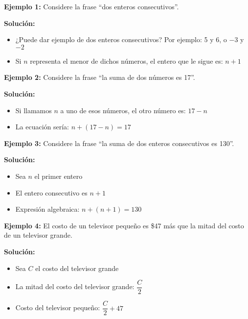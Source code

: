 \begin{example}
\textbf{Ejemplo 1:} Considere la frase ``dos enteros consecutivos''.

\textbf{Solución:}
\begin{itemize}
    \item ¿Puede dar ejemplo de dos enteros consecutivos? Por ejemplo: 5 y 6, o $-3$ y $-2$
    \item Si $n$ representa el menor de dichos números, el entero que le sigue es: $n + 1$
\end{itemize}
\end{example}

\begin{example}
\textbf{Ejemplo 2:} Considere la frase ``la suma de dos números es 17''.

\textbf{Solución:}
\begin{itemize}
    \item Si llamamos $n$ a uno de esos números, el otro número es: $17 - n$
    \item La ecuación sería: $n + (17-n) = 17$
\end{itemize}
\end{example}

\begin{example}
\textbf{Ejemplo 3:} Considere la frase ``la suma de dos enteros consecutivos es 130''.

\textbf{Solución:}
\begin{itemize}
    \item Sea $n$ el primer entero
    \item El entero consecutivo es $n+1$
    \item Expresión algebraica: $n + (n+1) = 130$
\end{itemize}
\end{example}

\begin{example}
\textbf{Ejemplo 4:} El costo de un televisor pequeño es \$47 más que la mitad del costo de un televisor grande.

\textbf{Solución:}
\begin{itemize}
    \item Sea $C$ el costo del televisor grande
    \item La mitad del costo del televisor grande: $\dfrac{C}{2}$
    \item Costo del televisor pequeño: $\dfrac{C}{2} + 47$
\end{itemize}
\end{example}

